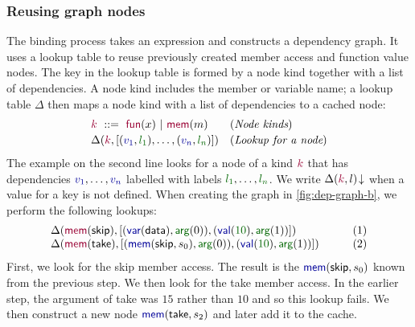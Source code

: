 \documentclass[english,crc,references=cleveref]{programming}
\theoremstyle{plain}
\theoremstyle{definition}
\newcommand{\Num}[1]{\num[color=numclr]{#1}}
\newcommand{\ident}[1]{\textnormal{\textcolor{idclr}{\sffamily #1}}}
\newcommand{\bndclr}[1]{\textcolor{kvdclr}{#1}}
\newcommand{\bkndclr}[1]{\textcolor{prepclr}{#1}}
\newcommand{\blblclr}[1]{\textcolor{numclr}{#1}}
\newcommand{\bnd}[1]{\textnormal{\textcolor{kvdclr}{\sffamily #1}}}
\newcommand{\bknd}[1]{\textnormal{\textcolor{prepclr}{\sffamily #1}}}
\newcommand{\blbl}[1]{\textnormal{\textcolor{numclr}{\sffamily #1}}}
\begin{document}

\subsubsection{Reusing graph nodes}
The binding process takes an expression and constructs a dependency graph.
It uses a lookup table to reuse previously created member access and function value nodes. The key
in the lookup table is formed by a node kind together with a list of dependencies. A node kind
includes the member or variable name; a lookup table $\Delta$ then maps a node kind with a list
of dependencies to a cached node:
%
\begin{equation*}
\begin{array}{ll}
\bkndclr{k}~::=~\bknd{fun}(x)~|~\bknd{mem}(m)&(\textit{Node kinds})\\[0.2em]
\Delta(\bkndclr{k}, [(\bndclr{v_1},\blblclr{l_1}), \ldots, (\bndclr{v_n},\blblclr{l_n})])  & (\textit{Lookup for a node})
\end{array}
\end{equation*}
%
The example on the second line looks for a node of a kind $\bkndclr{k}$ that has dependencies
$\bndclr{v_1}, \ldots, \bndclr{v_n}$ labelled with labels $\blblclr{l_1}, \ldots, \blblclr{l_n}$.
We write $\Delta(\bkndclr{k}, l)\!\downarrow$ when a value for a key is not defined.
When creating the graph in \cref{fig:dep-graph-b},
we perform the following lookups:
%
\begin{equation*}
\begin{array}{ll}
\Delta(\bknd{mem}(\ident{skip}), [(\bnd{var}(\ident{data}),\blbl{arg}(0)), (\bnd{val}(\Num{10}), \blbl{arg}(1))]) &\qquad(1)\\
\Delta(\bknd{mem}(\ident{take}), [(\bnd{mem}(\ident{skip}, s_0),\blbl{arg}(0)), (\bnd{val}(\Num{10}), \blbl{arg}(1))]) &\qquad(2)
\end{array}
\end{equation*}
%
First, we look for the \ident{skip} member access. The result is the $\bnd{mem}(\ident{skip}, s_0)$
known from the previous step. We then look for the \ident{take} member access. In the earlier
step, the argument of \ident{take} was $\Num{15}$ rather than $\Num{10}$ and so this lookup fails.
We then construct a new node $\bnd{mem}(\ident{take}, s_2)$ and later add it to the cache.

\end{document}
